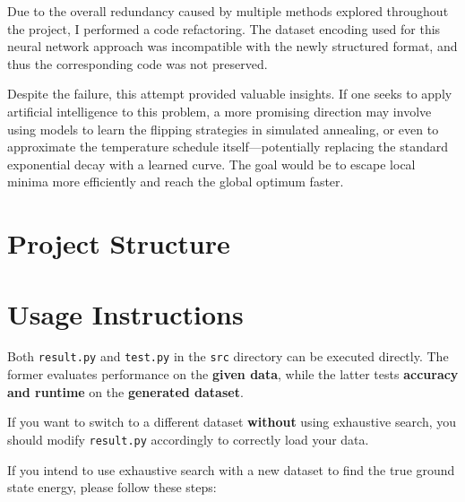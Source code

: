 \documentclass{article}
\begin{document}
Due to the overall redundancy caused by multiple methods explored throughout the project, I performed a code refactoring. The dataset encoding used for this neural network approach was incompatible with the newly structured format, and thus the corresponding code was not preserved.

Despite the failure, this attempt provided valuable insights. If one seeks to apply artificial intelligence to this problem, a more promising direction may involve using models to learn the flipping strategies in simulated annealing, or even to approximate the temperature schedule itself—potentially replacing the standard exponential decay with a learned curve. The goal would be to escape local minima more efficiently and reach the global optimum faster.

\section*{Project Structure}

\vspace{0.5cm}

\section*{Usage Instructions}

Both \texttt{result.py} and \texttt{test.py} in the \texttt{src} directory can be executed directly. The former evaluates performance on the \textbf{given data}, while the latter tests \textbf{accuracy and runtime} on the \textbf{generated dataset}.

If you want to switch to a different dataset \textbf{without} using exhaustive search, you should modify \texttt{result.py} accordingly to correctly load your data.

If you intend to use exhaustive search with a new dataset to find the true ground state energy, please follow these steps:
\end{document}
